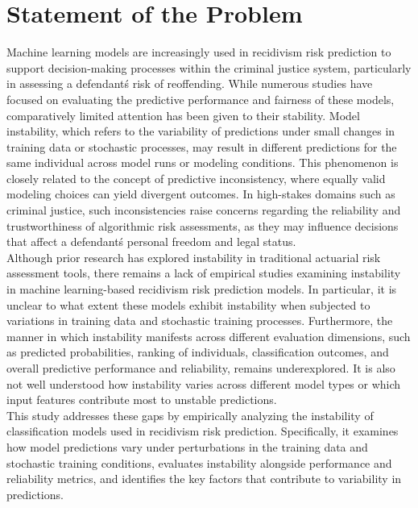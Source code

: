 \documentclass[12pt]{article}
\begin{document}
\section{Statement of the Problem} 
\tab Machine learning models are increasingly used in recidivism risk prediction to support decision-making processes within the criminal justice system, particularly in assessing a defendant\'s risk of reoffending. While numerous studies have focused on evaluating the predictive performance and fairness of these models, comparatively limited attention has been given to their stability. Model instability, which refers to the variability of predictions under small changes in training data or stochastic processes, may result in different predictions for the same individual across model runs or modeling conditions. This phenomenon is closely related to the concept of predictive inconsistency, where equally valid modeling choices can yield divergent outcomes. In high-stakes domains such as criminal justice, such inconsistencies raise concerns regarding the reliability and trustworthiness of algorithmic risk assessments, as they may influence decisions that affect a defendant\'s personal freedom and legal status.\\

Although prior research has explored instability in traditional actuarial risk assessment tools, there remains a lack of empirical studies examining instability in machine learning-based recidivism risk prediction models. In particular, it is unclear to what extent these models exhibit instability when subjected to variations in training data and stochastic training processes. Furthermore, the manner in which instability manifests across different evaluation dimensions, such as predicted probabilities, ranking of individuals, classification outcomes, and overall predictive performance and reliability, remains underexplored. It is also not well understood how instability varies across different model types or which input features contribute most to unstable predictions.\\

This study addresses these gaps by empirically analyzing the instability of classification models used in recidivism risk prediction. Specifically, it examines how model predictions vary under perturbations in the training data and stochastic training conditions, evaluates instability alongside performance and reliability metrics, and identifies the key factors that contribute to variability in predictions.
\end{document}
